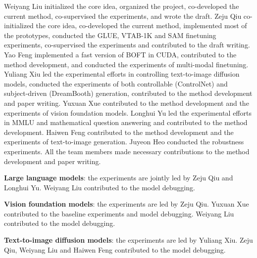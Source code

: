 \documentclass{article} %
\begin{document}
Weiyang Liu initialized the core idea, organized the project, co-developed the current method, co-supervised the experiments, and wrote the draft. Zeju Qiu co-initialized the core idea, co-developed the current method, implemented most of the prototypes, conducted the GLUE, VTAB-1K and SAM finetuning experiments, co-supervised the experiments and contributed to the draft writing. Yao Feng implemented a fast version of BOFT in CUDA, contributed to the method development, and conducted the experiments of multi-modal finetuning. Yuliang Xiu led the experimental efforts in controlling text-to-image diffusion models, conducted the experiments of both controllable (ControlNet) and subject-driven (DreamBooth) generation, contributed to the method development and paper writing. Yuxuan Xue contributed to the method development and the experiments of vision foundation models. Longhui Yu led the experimental efforts in MMLU and mathematical question answering and contributed to the method development. Haiwen Feng contributed to the method development and the experiments of text-to-image generation. Juyeon Heo conducted the robustness experiments. All the team members made necessary contributions to the method development and paper writing.

\vspace{-.5mm}

\textbf{Large language models}: the experiments are jointly led by Zeju Qiu and Longhui Yu. Weiyang Liu contributed to the model debugging.

\vspace{-1mm}

\textbf{Vision foundation models}: the experiments are led by Zeju Qiu. Yuxuan Xue contributed to the baseline experiments and model debugging. Weiyang Liu contributed to the model debugging.

\vspace{-1mm}

\textbf{Text-to-image diffusion models}: the experiments are led by Yuliang Xiu. Zeju Qiu, Weiyang Liu and Haiwen Feng contributed to the model debugging.





\end{document}
